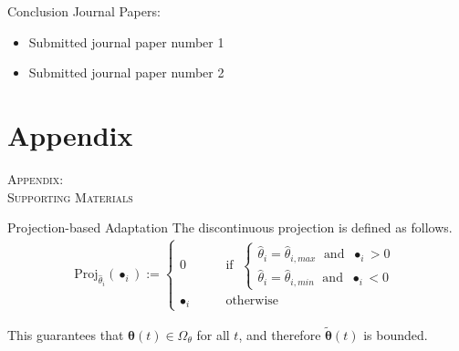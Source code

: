 \documentclass[english]{beamer}
\newcommand{\bs}[1]{\boldsymbol{#1}} %
\begin{document}
\begin{frame}{Conclusion}
%
Journal Papers:
\begin{small}
\begin{itemize}
\item Submitted journal paper number 1
\item Submitted journal paper number 2
\end{itemize}
\end{small}
%
\end{frame}


\section{Appendix}

\begin{frame}
\begin{center}
{\LARGE \textsc{Appendix: \\Supporting Materials}}
\end{center}
\end{frame}

\begin{frame}{Projection-based Adaptation} \label{eqn:proj-def}
The discontinuous projection is defined as follows.
%
%
\begin{align}
\text{Proj}_{\hat{\theta}_i}(\bullet_i) := \begin{cases}
0 & \text{if } \; \begin{cases} 
\hat{\theta}_{i} = \hat{\theta}_{i,max} \; \text{ and } \; \bullet_i>0 \\
\hat{\theta}_{i} = \hat{\theta}_{i,min} \; \text{ and } \; \bullet_i<0 
\end{cases} \\
\bullet_i \qquad &\text{otherwise}
\end{cases} \nonumber
\end{align}

This guarantees that $\hat{\bs{\theta}}(t) \in \Omega_\theta$ for all $t$, and therefore $\tilde{\bs{\theta}}(t)$ is bounded.

\end{frame}
\end{document}
